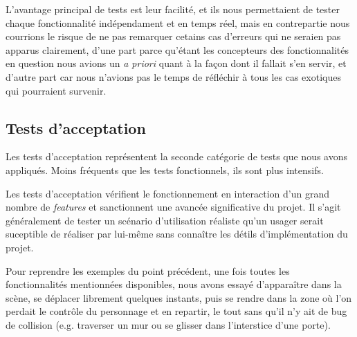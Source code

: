L'avantage principal de tests est leur facilité, et ils nous permettaient de tester chaque fonctionnalité indépendament et en temps réel, mais en contrepartie nous courrions le risque de ne pas remarquer cetains cas d'erreurs qui ne seraien pas apparus clairement, d'une part parce qu'étant les concepteurs des fonctionnalités en question nous avions un \textit{a priori} quant à la façon dont il fallait s'en servir, et d'autre part car nous n'avions pas le temps de réfléchir à tous les cas exotiques qui pourraient survenir. 

\subsection{Tests d'acceptation}
Les tests d'acceptation représentent la seconde catégorie de tests que nous avons appliqués. Moins fréquents que les tests fonctionnels, ils sont plus intensifs. \newline

Les tests d'acceptation vérifient le fonctionnement en interaction d'un grand nombre de \textit{features} et sanctionnent une avancée significative du projet. Il s'agit généralement de tester un scénario d'utilisation réaliste qu'un usager serait suceptible de réaliser par lui-même sans connaître les détils d'implémentation du projet. \newline

Pour reprendre les exemples du point précédent, une fois toutes les fonctionnalités mentionnées disponibles, nous avons essayé d'apparaître dans la scène, se déplacer librement quelques instants, puis se rendre dans la zone où l'on perdait le contrôle du personnage et en repartir, le tout sans qu'il n'y ait de bug de collision (e.g. traverser un mur ou se glisser dans l'interstice d'une porte). 
